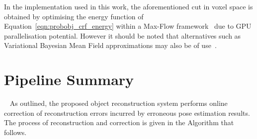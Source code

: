 In the implementation used in this work, the aforementioned cut in voxel space
is obtained by optimising the energy function of Equation~\ref{eqn:probobj_crf_energy} 
within a Max-Flow framework~\cite{Boykov2001} due to GPU parallelisation potential. However 
it should be noted that alternatives such as Variational Bayesian Mean Field approximations 
may also be of use~\cite{Krahenbuhl2011}.

\section{Pipeline Summary}
~\label{subsec:probobj_pipeline_summary}
As outlined, the proposed object reconstruction system performs online correction of 
reconstruction errors incurred by erroneous pose estimation results. The process of 
reconstruction and correction is given in the Algorithm that follows.

